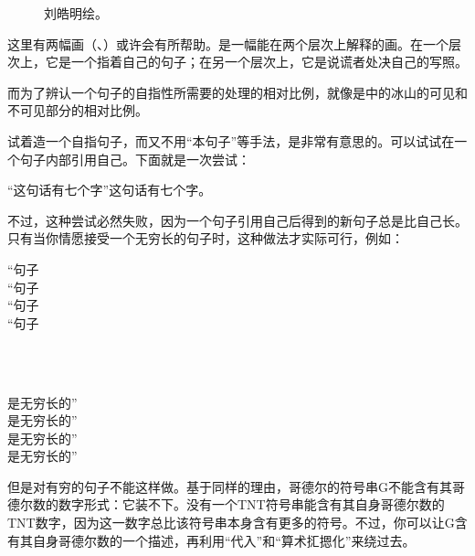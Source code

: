 \begin{figure}
\begin{floatrow}
          {\caption[说谎者处决自己。]{刘皓明绘。}}
\figurebox[\Xhsize]{\usebox\TEMPBOX}
          {\caption[说谎者悖论的冰山。]{}}
\end{floatrow}
\end{figure}

这里有两幅画（、）或许会有所帮助。是一幅能在两个层次上解释的画。在一个层次上，它是一个指着自己的句子；在另一个层次上，它是说谎者处决自己的写照。

而为了辨认一个句子的自指性所需要的处理的相对比例，就像是中的冰山的可见和不可见部分的相对比例。

试着造一个自指句子，而又不用“本句子”等手法，是非常有意思的。可以试试在一个句子内部引用自己。下面就是一次尝试：

\begin{block}
“这句话有七个字”这句话有七个字。
\end{block}

不过，这种尝试必然失败，因为一个句子引用自己后得到的新句子总是比自己长。只有当你情愿接受一个无穷长的句子时，这种做法才实际可行，例如：

\begingroup
“句子\indentcr[\ccwd]\\
\small “句子\\
\footnotesize “句子\\
\scriptsize “句子\strut\\
\indentcr*\\
\scriptsize 是无穷长的”\\
\footnotesize 是无穷长的”\\
\small 是无穷长的”\\
\normalsize 是无穷长的”\par
\endgroup

但是对有穷的句子不能这样做。基于同样的理由，哥德尔的符号串G不能含有其哥德尔数的数字形式：它装不下。没有一个TNT符号串能含有其自身哥德尔数的TNT数字，因为这一数字总比该符号串本身含有更多的符号。不过，你可以让G含有其自身哥德尔数的一个描述，再利用“代入”和“算术㧟摁化”来绕过去。


